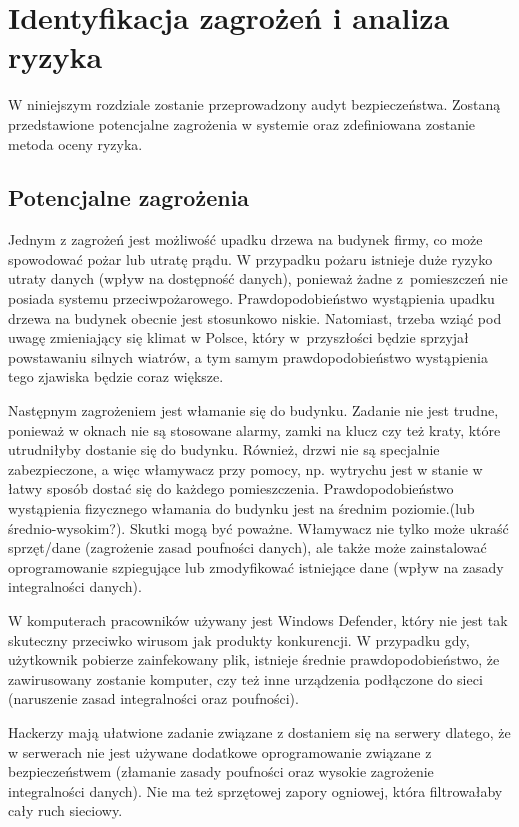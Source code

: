 \newpage\section{Identyfikacja zagrożeń \newline i analiza ryzyka}
W niniejszym rozdziale zostanie przeprowadzony audyt bezpieczeństwa. Zostaną przedstawione potencjalne zagrożenia w systemie oraz zdefiniowana zostanie metoda oceny ryzyka.

\subsection{Potencjalne zagrożenia}
Jednym z zagrożeń jest możliwość upadku drzewa na budynek firmy, co może spowodować pożar lub utratę prądu. W przypadku pożaru istnieje duże ryzyko utraty danych (wpływ na dostępność danych), ponieważ żadne z~pomieszczeń nie posiada systemu przeciwpożarowego.  Prawdopodobieństwo wystąpienia upadku drzewa na budynek obecnie jest stosunkowo niskie. Natomiast, trzeba wziąć pod uwagę zmieniający się klimat w Polsce, który w~przyszłości będzie sprzyjał powstawaniu silnych wiatrów, a tym samym prawdopodobieństwo wystąpienia tego zjawiska będzie coraz większe.

Następnym zagrożeniem jest włamanie się do budynku. Zadanie nie jest trudne, ponieważ w oknach nie są stosowane alarmy, zamki na klucz czy też kraty, które utrudniłyby dostanie się do budynku. Również, drzwi nie są specjalnie zabezpieczone, a więc włamywacz przy pomocy, np. wytrychu jest w stanie w łatwy sposób dostać się do każdego pomieszczenia. Prawdopodobieństwo wystąpienia fizycznego włamania do budynku jest na średnim poziomie.(lub średnio-wysokim?). Skutki mogą być poważne. Włamywacz nie tylko może ukraść sprzęt/dane (zagrożenie zasad poufności danych), ale także może zainstalować oprogramowanie szpiegujące lub zmodyfikować istniejące dane (wpływ na zasady integralności danych).

W komputerach pracowników używany jest Windows Defender, który nie jest tak skuteczny przeciwko wirusom jak produkty konkurencji. W przypadku gdy, użytkownik pobierze zainfekowany plik, istnieje średnie prawdopodobieństwo, że zawirusowany zostanie komputer, czy też inne urządzenia podłączone do sieci (naruszenie zasad integralności oraz poufności).

Hackerzy mają ułatwione zadanie związane z dostaniem się na serwery dlatego, że w serwerach nie jest używane dodatkowe oprogramowanie związane z bezpieczeństwem (złamanie zasady poufności oraz wysokie zagrożenie integralności danych). Nie ma też sprzętowej zapory ogniowej, która filtrowałaby cały ruch sieciowy.	

